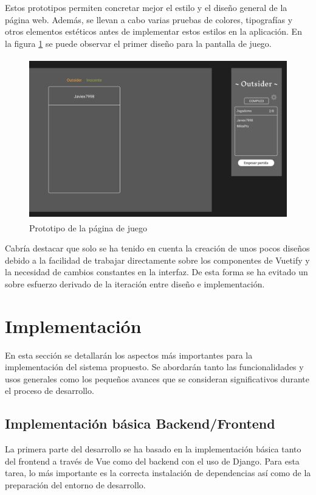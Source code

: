 Estos prototipos permiten concretar mejor el estilo y el diseño general de la página web. Además, 
se llevan a cabo varias pruebas de colores, tipografías y otros elementos estéticos antes de 
implementar estos estilos en la aplicación. En la figura \ref{fig:res_designJuego} se puede observar el primer diseño para la pantalla
de juego.

\begin{figure}[h]
	\centering
	\includegraphics[height=7cm]{res_designJuego.png}
	\caption{Prototipo de la página de juego}
	\label{fig:res_designJuego}
\end{figure}

Cabría destacar que solo se ha tenido en cuenta la creación de unos pocos diseños debido a la facilidad de trabajar directamente
sobre los componentes de Vuetify y la necesidad de cambios constantes en la interfaz. De esta forma se ha evitado un 
sobre esfuerzo derivado de la iteración entre diseño e implementación.

\section{Implementación}

En esta sección se detallarán los aspectos más importantes para la implementación del sistema propuesto. 
Se abordarán tanto las funcionalidades y usos generales como los pequeños avances que se consideran significativos 
durante el proceso de desarrollo.

\subsection{Implementación básica Backend/Frontend}

La primera parte del desarrollo se ha basado en la implementación básica tanto del frontend a través de Vue como del 
backend con el uso de Django. Para esta tarea, lo más importante es la correcta instalación de dependencias así como de
la preparación del entorno de desarrollo.

